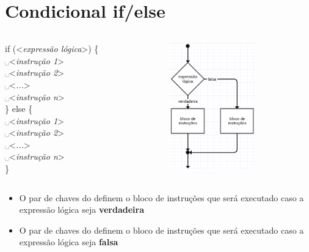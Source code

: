 \documentclass[portuguese,10pt,xcolor=table]{bredelebeamer}
\def\exp[#1]{\color{gray}<\textit{#1}>\color{black}}
\def\espaco{\color{gray}\hspace{0.2cm}\color{black}}
\def\espaco{\color{blue}␣\color{black}}
\begin{document}
	\section{Condicional if/else}
	\begin{frame}[c]
		\begin{center}
		\end{center}
	\end{frame} 
	\begin{frame} 

				\begin{columns}[t]
					\begin{column}[T]{.4\textwidth}
						if (\exp[expressão lógica]) \{\\
						\espaco \exp[instrução 1]\\
						\espaco \exp[instrução 2]\\
						\espaco \exp[...]\\
						\espaco \exp[instrução n]\\
						\} else \{\\
						\espaco \exp[instrução 1]\\
						\espaco \exp[instrução 2]\\
						\espaco \exp[...]\\
						\espaco \exp[instrução n]\\
						\}
					\end{column}
							\begin{column}[T]{.4\textwidth}
								\includegraphics[height=5.5cm]{imagens/condicional_ifelse.png}
							\end{column}
				\end{columns}

		\begin{itemize}
			\item O par de chaves do  definem o bloco de instruções que será executado caso a expressão lógica seja \textbf{verdadeira}
			\item O par de chaves do  definem o bloco de instruções que será executado caso a expressão lógica seja \textbf{falsa}
		\end{itemize}
	\end{frame}
\end{document}
